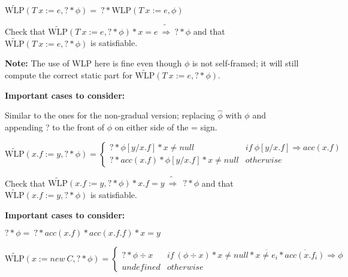 \documentclass {article}
\newcommand{\eif}[3]{if \ ( #1 ) \ \{ #2 \} \ else \ \{#3\}}
\newcommand{\fphi}{\widehat{\phi}}
\newcommand{\imp}{\Rightarrow}
\newcommand{\timp}{\ \widetilde{\Rightarrow}\ }
\newcommand{\wlp}[2]{\text{WLP}(#1,#2)}
\newcommand{\twlp}[2]{\widetilde{\text{WLP}}(#1,#2)}
\begin{document}
\vspace{0.5cm}

%
%
%

$\twlp{T \ x := e}{? \ast \phi} = \ ? \ast \wlp{T \ x :=e}{\phi}$
	
Check that $\twlp{T \ x := e}{? \ast \phi} \ast x = e \timp ? \ast \phi$ and that $\twlp{T \ x := e}{? \ast \phi}$ is satisfiable.

\textbf{Note:} The use of WLP here is fine even though $\phi$ is not self-framed; it will still compute the correct static part for $\twlp{T \ x := e}{? \ast \phi}$.

\textbf{Important cases to consider:}

Similar to the ones for the non-gradual version; replacing $\fphi$ with $\phi$ and appending ? to the front of $\phi$ on either side of the = sign.

\vspace{0.5cm}

%

$\twlp{x.f := y}{? \ast \phi} =
	\begin{cases}
	 ? \ast \phi[y/x.f] \ast x \neq null & if \ \phi[y/x.f] \imp acc(x.f) \\
	 ? \ast acc(x.f) \ast \phi[y/x.f] \ast x \neq null & otherwise
	\end{cases}$

Check that $\twlp{x.f := y}{? \ast \phi} \ast x.f = y \timp \ ? \ast \phi$ and that $\twlp{x.f := y}{? \ast \phi}$ is satisfiable.

\textbf{Important cases to consider:}

$? \ast \phi = \ ? \ast acc(x.f) \ast acc(x.f.f) \ast x = y $

\vspace{0.5cm}

$\twlp{x := new\ C}{? \ast \phi} = 
	\begin{cases}
	 ? \ast \phi \div x & if \ (\phi \div x) \ast x \neq null \ast \overline{x \neq e_i} \ast \overline{acc(x.f_i)} \imp \phi \\
	 undefined & otherwise
	\end{cases}$ 
\end{document}
